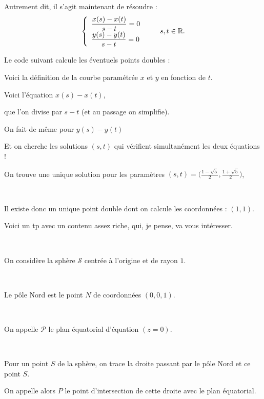 \change

Autrement dit, il s'agit maintenant de résoudre :
   $$\left\{
  \begin{array}{l}
  \dfrac{x(s)-x(t)}{s-t} = 0  \\[1mm]
  \dfrac{y(s)-y(t)}{s-t} = 0
  \end{array}
  \right.\qquad  s,t \in \mathbb{R}.$$   

\diapo

  Le code suivant calcule les éventuels points doubles :
  
  Voici la définition de la courbe paramétrée $x$ et $y$ en fonction de $t$.

\change

  
  Voici l'équation $x(s)-x(t)$,

\change
  
  que l'on divise par $s-t$ (et au passage on simplifie).

\change
  
  On fait de même pour $y(s)-y(t)$
  
\change

  Et on cherche les solutions $(s,t)$ qui vérifient simultanément les deux équations  !
 
\change   
  On trouve une unique solution pour les paramètres 
  $(s,t) = \big(\frac{1-\sqrt5}{2}, \frac{1+\sqrt5}{2}\big)$, 
  

~

Il existe donc un unique point double dont on calcule les coordonnées : $(1,1)$.


\diapo


Voici un tp avec un contenu assez riche, qui, je pense, va vous intéresser.

~


On considère la sphère $\mathcal{S}$ centrée à l'origine et de rayon $1$.

~


Le pôle Nord est le point $N$ de coordonnées $(0,0,1)$. 

~

On appelle $\mathcal{P}$ le plan équatorial d'équation $(z=0)$.


~

Pour un point $S$ de la sphère, on trace la droite passant par le pôle Nord
et ce point $S$. 

On appelle alors $P$ le point d'intersection de cette droite avec le plan équatorial.

